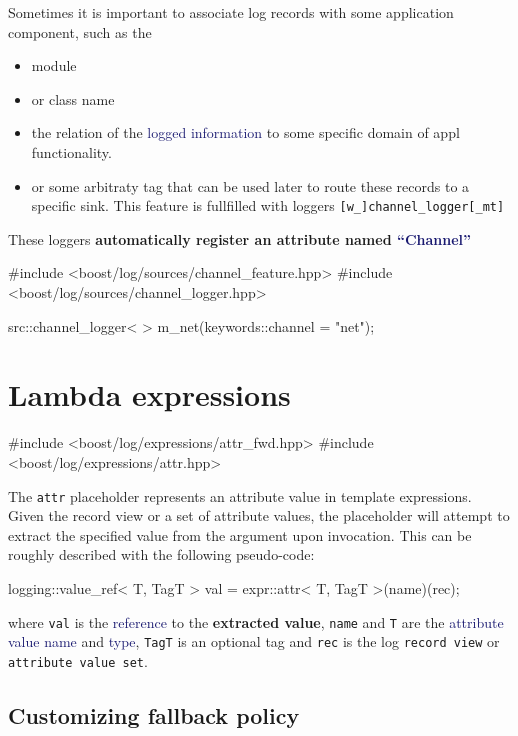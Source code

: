 \documentclass[dvipsnames]{article}
\newcommand{\mycola}{MidnightBlue}
\newcommand{\cola}[1]{\textcolor{\mycola}{#1}}
\begin{document}
Sometimes it is important to associate log records with some application
component, such as the
\begin{itemize}
\item module 
\item or class name
\item the relation of the \cola{logged information} to some specific domain of
  appl functionality.
\item or some arbitraty tag that can be used later to route these records to a
  specific sink. This feature is fullfilled with loggers
  \verb|[w_]channel_logger[_mt]|
\end{itemize}
These loggers \textbf{automatically register an attribute named \cola{``Channel''}}
\begin{simplec}
  #include <boost/log/sources/channel_feature.hpp>
  #include <boost/log/sources/channel_logger.hpp>

  src::channel_logger< > m_net(keywords::channel = "net");
\end{simplec}

\section{Lambda expressions}
\begin{simplec}
  #include <boost/log/expressions/attr_fwd.hpp>
  #include <boost/log/expressions/attr.hpp>
\end{simplec}
The \texttt{attr} placeholder represents an attribute value in template
expressions. Given the record view or a set of attribute values, the placeholder
will attempt to extract the specified value from the argument upon invocation.
This can be roughly described with the following pseudo-code:

\begin{simplec}
  logging::value_ref< T, TagT > val = expr::attr< T, TagT >(name)(rec);
\end{simplec}

where \texttt{val} is the \cola{reference} to the \textbf{extracted value},
\texttt{name} and \texttt{T} are the \cola{attribute value name} and
\cola{type}, \texttt{TagT} is an optional tag and \texttt{rec} is the log
\texttt{record view} or \texttt{attribute value set}.

\subsection{Customizing fallback policy}
\end{document}
